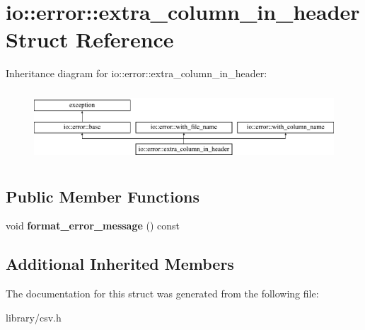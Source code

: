 \hypertarget{structio_1_1error_1_1extra__column__in__header}{}\section{io\+:\+:error\+:\+:extra\+\_\+column\+\_\+in\+\_\+header Struct Reference}
\label{structio_1_1error_1_1extra__column__in__header}
Inheritance diagram for io\+:\+:error\+:\+:extra\+\_\+column\+\_\+in\+\_\+header\+:\begin{figure}[H]
\begin{center}
\leavevmode
\includegraphics[height=2.666667cm]{structio_1_1error_1_1extra__column__in__header}
\end{center}
\end{figure}
\subsection*{Public Member Functions}
\begin{DoxyCompactItemize}
\item 
\mbox{\label{structio_1_1error_1_1extra__column__in__header_ab7bb962a470c429206c51729fbf114dd}} 
void {\bfseries format\+\_\+error\+\_\+message} () const
\end{DoxyCompactItemize}
\subsection*{Additional Inherited Members}


The documentation for this struct was generated from the following file\+:\begin{DoxyCompactItemize}
\item 
library/csv.\+h\end{DoxyCompactItemize}
